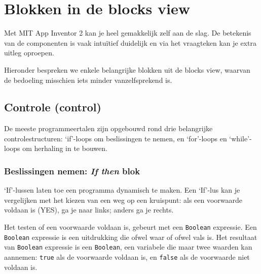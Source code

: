 \section{Blokken in de blocks view}
\label{sec:Mod2_Sec2}
%
Met MIT App Inventor 2 kan je heel gemakkelijk zelf aan de slag. De betekenis van de componenten is vaak intu\"itief duidelijk en via het vraagteken kan je extra uitleg oproepen. 

Hieronder bespreken we enkele belangrijke blokken uit de blocks view, waarvan de bedoeling misschien iets minder vanzelfsprekend is.

\subsection{Controle (control)}
De meeste programmeertalen zijn opgebouwd rond drie belangrijke controlestructuren: \textquoteleft if\textquoteright-loops om beslissingen te nemen, en \textquoteleft for\textquoteright-loops en \textquoteleft while\textquoteright-loops om herhaling in te bouwen.

\subsubsection{Beslissingen nemen: \emph{If then} blok}

\begin{minipage}{.5\linewidth}
\end{minipage}
\begin{minipage}{.5\linewidth}
\end{minipage}

\textquoteleft If\textquoteright-lussen laten toe een programma dynamisch te maken. Een \textquoteleft If\textquoteright-lus kan je vergelijken met het kiezen van een weg op een kruispunt: als een voorwaarde voldaan is (YES), ga je naar links; anders ga je rechts. 

Het testen of een voorwaarde voldaan is, gebeurt met een \texttt{Boolean} expressie.
Een \texttt{Boolean} expressie is een uitdrukking die ofwel waar of ofwel vals is.
Het resultaat van \texttt{Boolean} expressie is een \texttt{Boolean}, een variabele die maar twee waarden kan aannemen: \texttt{true} als de voorwaarde voldaan is, en \texttt{false} als de voorwaarde niet voldaan is.

